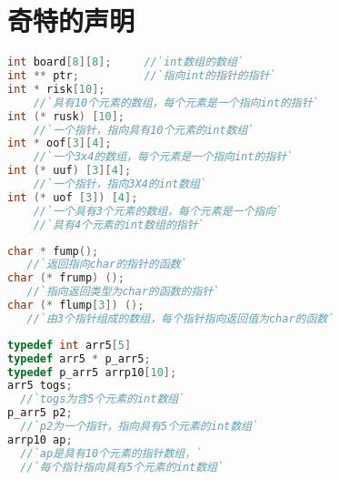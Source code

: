 \section{奇特的声明}

\begin{frame}[fragile]\ft{\secname}
  \begin{lstlisting}[language=c,backgroundcolor=\color{red!20}]
int board[8][8];     //`int数组的数组`
int ** ptr;          //`指向int的指针的指针`
int * risk[10];      
    //`具有10个元素的数组，每个元素是一个指向int的指针`
int (* rusk) [10];   
    //`一个指针，指向具有10个元素的int数组`
int * oof[3][4];
    //`一个3x4的数组，每个元素是一个指向int的指针`
int (* uuf) [3][4];
    //`一个指针，指向3X4的int数组`
int (* uof [3]) [4];
    //`一个具有3个元素的数组，每个元素是一个指向`
    //`具有4个元素的int数组的指针`
  \end{lstlisting}
\end{frame}

\begin{frame}[fragile]\ft{\secname}
  \begin{lstlisting}[language=c,backgroundcolor=\color{red!20}]
char * fump();    
   //`返回指向char的指针的函数`
char (* frump) ();     
   //`指向返回类型为char的函数的指针`
char (* flump[3]) (); 
   //`由3个指针组成的数组，每个指针指向返回值为char的函数`
  \end{lstlisting}
\end{frame}

\begin{frame}[fragile]\ft{\secname}

  \begin{lstlisting}[language=c,backgroundcolor=\color{red!20}]
typedef int arr5[5]
typedef arr5 * p_arr5;
typedef p_arr5 arrp10[10];
arr5 togs;
  //`togs为含5个元素的int数组`
p_arr5 p2;   
  //`p2为一个指针，指向具有5个元素的int数组`
arrp10 ap;
  //`ap是具有10个元素的指针数组，`
  //`每个指针指向具有5个元素的int数组`
  \end{lstlisting}

\end{frame}
